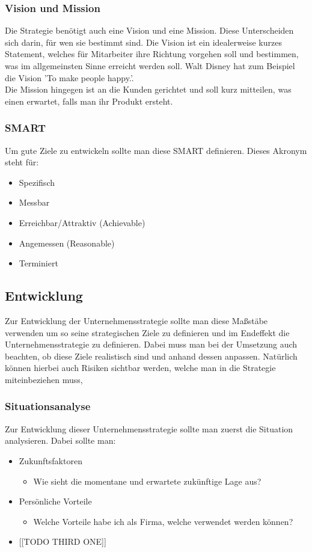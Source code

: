 \documentclass{article}
\begin{document}
  \subsubsection{Vision und Mission}
  Die Strategie benötigt auch eine Vision und eine Mission. Diese Unterscheiden sich darin, für wen sie bestimmt sind. Die Vision ist ein idealerweise kurzes Statement, welches für Mitarbeiter ihre Richtung vorgehen soll und bestimmen, was im allgemeinsten Sinne erreicht werden soll. Walt Disney hat zum Beispiel die Vision 'To make people happy.'. \\
  Die Mission hingegen ist an die Kunden gerichtet und soll kurz mitteilen, was einen erwartet, falls man ihr Produkt ersteht.
  \subsubsection{SMART}
  Um gute Ziele zu entwickeln sollte man diese SMART definieren. Dieses Akronym steht für:
  \begin{itemize}
    \item{Spezifisch}
    \item{Messbar}
    \item{Erreichbar/Attraktiv (Achievable)}
    \item{Angemessen (Reasonable)}
    \item{Terminiert}
  \end{itemize}
  \subsection{Entwicklung}
  Zur Entwicklung der Unternehmensstrategie sollte man diese Maßstäbe verwenden um so seine strategischen Ziele zu definieren und im Endeffekt die Unternehmensstrategie zu definieren. Dabei muss man bei der Umsetzung auch beachten, ob diese Ziele realistisch sind und anhand dessen anpassen. Natürlich können hierbei auch Risiken sichtbar werden, welche man in die Strategie miteinbeziehen muss,
  \subsubsection{Situationsanalyse}
  Zur Entwicklung dieser Unternehmensstrategie sollte man zuerst die Situation analysieren. Dabei sollte man:
  \begin{itemize}
    \item{Zukunftsfaktoren}
    \begin{itemize}
      \item{Wie sieht die momentane und erwartete zukünftige Lage aus?}
    \end{itemize}
    \item{Persönliche Vorteile}
    \begin{itemize}
      \item{Welche Vorteile habe ich als Firma, welche verwendet werden können?}
    \end{itemize}
    \item{[[TODO THIRD ONE]]}
  \end{itemize}
\end{document}
